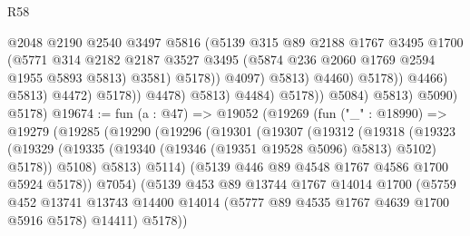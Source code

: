 \begin{lexlean}{R58}
\begin{coremodule}
                                            @2048
                                            @2190
                                            @2540
                                            @3497
                                            @5816
                                            (@5139
                                              @315
                                              @89
                                              @2188
                                              @1767
                                              @3495
                                              @1700
                                              (@5771
                                                @314
                                                @2182
                                                @2187
                                                @3527
                                                @3495
                                                (@5874 @236 @2060 @1769 @2594 @1955 @5893 @5813)
                                                @3581)
                                              @5178))
                                          @4097)
                                        @5813)
                                      @4460)
                                    @5178))
                                @4466)
                              @5813)
                            @4472)
                          @5178))
                      @4478)
                    @5813)
                  @4484)
                @5178))
            @5084)
          @5813)
        @5090)
      @5178)
@19674 := fun (a : @47) =>
  @19052
    (@19269
      (fun ("_" : @18990) =>
      @19279
        (@19285
          (@19290
            (@19296
              (@19301
                (@19307
                  (@19312
                    (@19318
                      (@19323
                        (@19329 (@19335 (@19340 (@19346 (@19351 @19528 @5096) @5813) @5102) @5178))
                        @5108)
                      @5813)
                    @5114)
                  (@5139 @446 @89 @4548 @1767 @4586 @1700 @5924 @5178))
                @7054)
              (@5139
                @453
                @89
                @13744
                @1767
                @14014
                @1700
                (@5759
                  @452
                  @13741
                  @13743
                  @14400
                  @14014
                  (@5777 @89 @4535 @1767 @4639 @1700 @5916 @5178)
                  @14411)
                @5178))

\end{coremodule}
\end{lexlean}
